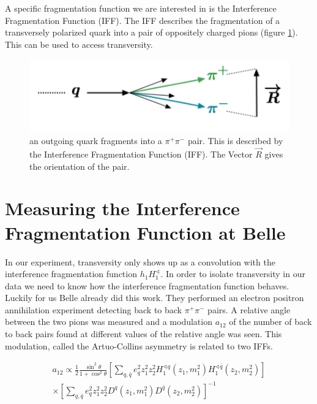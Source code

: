 \documentclass[abstract = on,listof=totoc, bibliography=totoc]{scrreprt}
\begin{document}
A specific fragmentation function we are interested in is the Interference Fragmentation Function (IFF). The IFF describes the fragmentation of a transversely polarized quark into a pair of oppositely charged pions (figure \ref{fig:IFF}). This can be used to access transversity\cite{accessTransWithIFF}.   

\begin{figure}
\begin{center}
\includegraphics[width = .7\textwidth]{IFFwrite}
\caption[Interference Fragmentation Function]{an outgoing quark fragments into a $\pi^+\pi^-$ pair. This is described by the Interference Fragmentation Function (IFF). The Vector $\vec{R}$ gives the orientation of the pair.}
\label{fig:IFF}
\end{center}
\end{figure}

\section{Measuring the Interference Fragmentation Function at Belle}

In our experiment, transversity only shows up as a convolution with the interference fragmentation function $h_1H_1^\sphericalangle$. In order to isolate transversity in our data we need to know how the interference fragmentation function behaves. Luckily for us Belle already did this work\cite{belleIFF}. They performed an electron positron annihilation experiment detecting back to back $\pi^+\pi^-$ pairs. A relative angle between the two pions was measured and a modulation $a_{12}$ of the number of back to back pairs found at different values of the relative angle was seen. This modulation, called the Artuo-Collins asymmetry is related to two IFFs. 
     
\begin{multline}
a_{12} \propto \frac{1}{2} \frac{\sin^2\theta}{1+\cos^2\theta} \left[ \sum_{q,\bar{q}}e_q^2z_1^2z_2^2H_1^{\sphericalangle q}(z_1, m_1^2)H_1^{\sphericalangle \bar{q}}(z_2, m_2^2)\right] \\ \times \left[ \sum_{q,\bar{q}}e_q^2z_1^2z_2^2D^{q}(z_1, m_1^2)D^{\bar{q}}(z_2, m_2^2)\right]^{-1}
\label{eq:A-Casym}
\end{multline}
\end{document}
